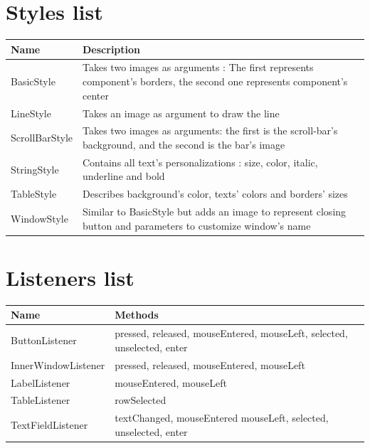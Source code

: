 \documentclass{scrreprt}
\begin{document}
					\chapter{Styles list}
\begin{tabular}{|p{3cm}|p{10cm}|}
\hline
Name & Description \\
\hline
BasicStyle & Takes two images as arguments : The first represents component's borders, the second one represents component's center  \\
\hline
LineStyle & Takes an image as argument to draw the line  \\
\hline
ScrollBarStyle & Takes two images as arguments: the first is the scroll-bar's background, and the second is the bar's image  \\
\hline
StringStyle & Contains all text's personalizations : size, color, italic, underline and bold  \\
\hline
TableStyle & Describes background's color, texts' colors and borders' sizes  \\
\hline
WindowStyle & Similar to BasicStyle but adds an image to represent closing button and parameters to customize window's name  \\
\hline
\end{tabular}

					\chapter{Listeners list}
\begin{tabular}{|p{4cm}|p{10cm}|}
\hline
Name & Methods\\
\hline
ButtonListener & pressed, released, mouseEntered, mouseLeft, selected, unselected, enter \\
\hline
InnerWindowListener & pressed, released, mouseEntered, mouseLeft \\
\hline
LabelListener & mouseEntered, mouseLeft \\
\hline
TableListener & rowSelected \\
\hline
TextFieldListener & textChanged, mouseEntered mouseLeft, selected, unselected, enter \\
\hline
\end{tabular}
\end{document}
